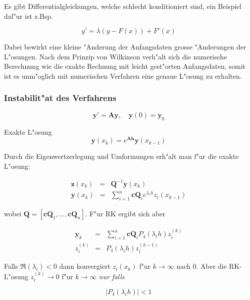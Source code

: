 \documentclass[german, 10pt, a4paper, twocolumn]{scrartcl}
\theoremstyle{definition}
\begin{document}
Es gibt Differentialgleichungen, welche schlecht konditioniert sind, ein Beispiel daf"ur ist z.Bsp.

\begin{displaymath}
	y' = \lambda (y - F(x)) + F'(x)
\end{displaymath}

Dabei bewirkt eine kleine "Anderung der Anfangsdaten grosse "Anderungen der L"osungen. Nach dem Prinzip von Wilkinson verh"alt sich die numerische Berechnung wie die exakte Rechnung mit leicht gest"orten Anfangsdaten, somit ist es unm"oglich mit numerischen Verfahren eine genaue L"osung zu erhalten.

\subsubsection{Instabilit"at des Verfahrens}

\begin{displaymath}
	\mathbf{y}' = \mathbf{A} \mathbf{y}, \quad \mathbf{y}(0) = \mathbf{y}_0
\end{displaymath}

Exakte L"osung
\begin{displaymath}
	\mathbf{y}(x_k) = e^{\mathbf{Ah}}\mathbf{y}(x_{k-1})
\end{displaymath}

Durch die Eigenwertzerlegung und Umformungen erh"alt man f"ur die exakte L"osung:

\begin{eqnarray*}
	\mathbf{z}(x_k) &	= &	\mathbf{Q}^{-1} \mathbf{y}(x_k)\\
	\mathbf{y}(x_k) &	= &	\sum^n_{i=1} \mathbf{cQ}_i e^{\lambda_i h} z_i(x_{k-1})
\end{eqnarray*}

wobei $\mathbf{Q} = [ \mathbf{cQ}_1,\ldots, \mathbf{cQ}_n ]$. F"ur RK ergibt sich aber

\begin{eqnarray*}
	\mathbf{y}_k &		= &	\sum^n_{i=1} \mathbf{cQ}_i P_4 (\lambda_i h) z_i^{(k)}\\
	z_{i}^{(k)} &		= &	P_4(\lambda_i h) z_i^{(k-1)}
\end{eqnarray*}

Falls $\Re(\lambda_i) < 0$ dann konvergiert $z_i(x_k)$ f"ur $k\to \infty$ nach 0. Aber die RK-L"osung $z_i^{(k)} \to 0$ f"ur $k \to \infty$ \textit{nur falls}

\begin{displaymath}
	|P_4(\lambda_i h)| < 1
\end{displaymath}
\end{document}
